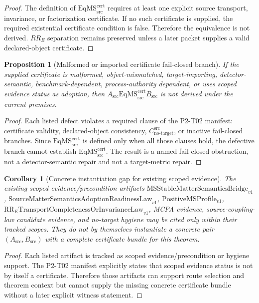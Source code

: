 \documentclass[11pt]{article}
\newcommand{\CNTI}{C_{\mathrm{no\text{-}target}}^{\mathrm{src}}}
\newcommand{\EqMS}{\mathrm{EqMS}_{\mathrm{src}}^{\mathrm{cert}}}
\newcommand{\PositiveMSProfile}{\mathrm{PositiveMSProfile}_{v1}}
\newcommand{\SMSAR}{\mathrm{SourceMatterSemanticsAdoptionReadinessLaw}_{v1}}
\newcommand{\LawRR}{\mathrm{RR}_{E}\mathrm{TransportCompletenessOrInvarianceLaw}_{v1}}
\newcommand{\MSStable}{\mathrm{MSStableMatterSemanticsBridge}_{v1}}
\newtheorem{proposition}{Proposition}
\newtheorem{corollary}{Corollary}
\begin{document}
\begin{proof}
The definition of \(\EqMS\) requires at least one explicit source transport,
invariance, or factorization certificate. If no such certificate is supplied,
the required existential certificate condition is false. Therefore the
equivalence is not derived. \(RR_E\) separation remains preserved unless a
later packet supplies a valid declared-object certificate.
\end{proof}

\begin{proposition}[Malformed or imported certificate fail-closed branch]
If the supplied certificate is malformed, object-mismatched, target-importing,
detector-semantic, benchmark-dependent, process-authority dependent, or uses
scoped evidence status as adoption, then \(A_{\mathrm{src}}\EqMS
B_{\mathrm{src}}\) is not derived under the current premises.
\end{proposition}

\begin{proof}
Each listed defect violates a required clause of the P2-T02 manifest:
certificate validity, declared-object consistency, \(\CNTI\), or inactive
fail-closed branches. Since \(\EqMS\) is defined only when all those clauses
hold, the defective branch cannot establish \(\EqMS\). The result is a named
fail-closed obstruction, not a detector-semantic repair and not a target-metric
repair.
\end{proof}

\begin{corollary}[Concrete instantiation gap for existing scoped evidence]
The existing scoped evidence/precondition artifacts \(\MSStable\), \(\SMSAR\),
\(\PositiveMSProfile\), \(\LawRR\), MCPA evidence, source-coupling-law
candidate evidence, and no-target hygiene may be cited only within their
tracked scopes. They do not by themselves instantiate a concrete pair
\((A_{\mathrm{src}},B_{\mathrm{src}})\) with a complete certificate bundle for
this theorem.
\end{corollary}

\begin{proof}
Each listed artifact is tracked as scoped evidence/precondition or hygiene
support. The P2-T02 manifest explicitly states that scoped evidence status is
not by itself a certificate. Therefore those artifacts can support route
selection and theorem context but cannot supply the missing concrete
certificate bundle without a later explicit witness statement.
\end{proof}
\end{document}

